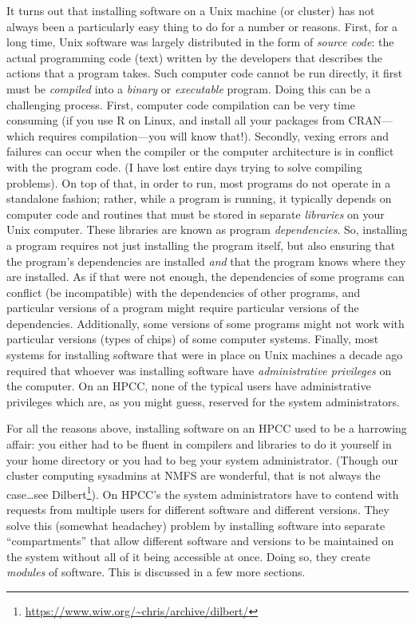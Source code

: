 \documentclass[]{krantz}
\renewcommand{\href}[2]{#2\footnote{\url{#1}}}
\begin{document}
It turns out that installing software on a Unix machine (or cluster) has not
always been a particularly easy thing to do for a number or reasons. First, for
a long time, Unix software was largely distributed in the form of \emph{source code}: the
actual programming code (text) written by the developers that describes the actions
that a program takes. Such computer code cannot be run directly, it first must be
\emph{compiled} into a \emph{binary} or \emph{executable} program. Doing this can be a challenging
process. First, computer code compilation can be very time consuming (if you use R
on Linux, and install all your packages from CRAN---which requires compilation---you
will know that!). Secondly, vexing errors and failures can occur when the
compiler or the computer architecture is in conflict with the program code. (I have lost
entire days trying to solve compiling problems). On top of that, in order to run, most
programs do not operate in a standalone fashion; rather, while a program is running, it
typically depends on computer code and routines that must be stored in separate \emph{libraries} on your
Unix computer. These libraries are known as program \emph{dependencies}. So, installing a program
requires not just installing the program itself, but also ensuring that the program's dependencies
are installed \emph{and} that the program knows where they are installed. As if that were not enough,
the dependencies of some programs can conflict (be incompatible) with the dependencies of other
programs, and particular versions of a program might require particular versions of
the dependencies. Additionally, some versions of some programs might not work with particular
versions (types of chips) of some computer systems. Finally, most systems for installing
software that were in place on Unix
machines a decade ago required that whoever was installing software have \emph{administrative privileges}
on the computer. On an HPCC, none of the typical users have administrative privileges which are,
as you might guess, reserved for the system administrators.

For all the reasons above, installing software on an HPCC used to be a harrowing
affair: you either had to be fluent in compilers and libraries to do it yourself in your
home directory or you had to beg your system administrator. (Though our cluster computing
sysadmins at NMFS are wonderful, that is not always the case\ldots{}\href{https://www.wiw.org/~chris/archive/dilbert/}{see Dilbert}).
On HPCC's the system administrators have to contend with requests from multiple users
for different software and different versions. They solve this (somewhat headachey)
problem by installing software into separate ``compartments'' that allow different software
and versions to be maintained on the system without all of it being accessible at once.
Doing so, they create \emph{modules} of software. This is discussed in a few more sections.
\end{document}
